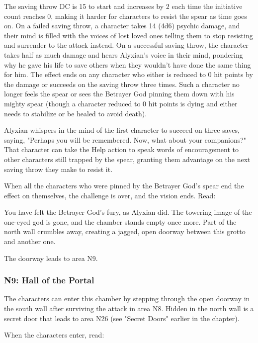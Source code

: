 \documentclass[10pt,a4paper,twoside,fancy,bg=print,twocolumn,openany,nodeprecatedcode]{dndbook}
\begin{document}
The saving throw DC is 15 to start and increases by 2 each time the initiative count reaches 0, making it harder for characters to resist the spear as time goes on. On a failed saving throw, a character takes 14 (4d6) psychic damage, and their mind is filled with the voices of lost loved ones telling them to stop resisting and surrender to the attack instead. On a successful saving throw, the character takes half as much damage and hears Alyxian's voice in their mind, pondering why he gave his life to save others when they wouldn't have done the same thing for him. The effect ends on any character who either is reduced to 0 hit points by the damage or succeeds on the saving throw three times. Such a character no longer feels the spear or sees the Betrayer God pinning them down with his mighty spear (though a character reduced to 0 hit points is dying and either needs to stabilize or be healed to avoid death).

Alyxian whispers in the mind of the first character to succeed on three saves, saying, "Perhaps you will be remembered. Now, what about your companions?" That character can take the Help action to speak words of encouragement to other characters still trapped by the spear, granting them advantage on the next saving throw they make to resist it.

When all the characters who were pinned by the Betrayer God's spear end the effect on themselves, the challenge is over, and the vision ends. Read:

\begin{DndReadAloud}{}
You have felt the Betrayer God's fury, as Alyxian did. The towering image of the one-eyed god is gone, and the chamber stands empty once more. Part of the north wall crumbles away, creating a jagged, open doorway between this grotto and another one.

\end{DndReadAloud}

The doorway leads to area N9.

\subsubsection{N9: Hall of the Portal}
The characters can enter this chamber by stepping through the open doorway in the south wall after surviving the attack in area N8. Hidden in the north wall is a secret door that leads to area N26 (see "Secret Doors" earlier in the chapter).

When the characters enter, read:
\end{document}
